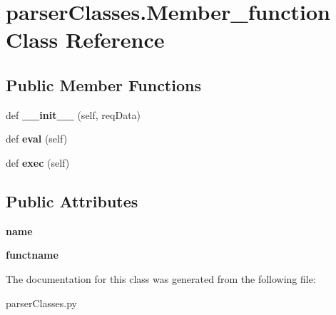 \hypertarget{classparser_classes_1_1_member__function}{}\section{parser\+Classes.\+Member\+\_\+function Class Reference}
\label{classparser_classes_1_1_member__function}
\subsection*{Public Member Functions}
\begin{DoxyCompactItemize}
\item 
def {\bfseries \+\_\+\+\_\+init\+\_\+\+\_\+} (self, req\+Data)\hypertarget{classparser_classes_1_1_member__function_a497b32d0e46480abd8f4f573ee68a3b0}{}\label{classparser_classes_1_1_member__function_a497b32d0e46480abd8f4f573ee68a3b0}

\item 
def {\bfseries eval} (self)\hypertarget{classparser_classes_1_1_member__function_ae132533c55122b32a25746696db39249}{}\label{classparser_classes_1_1_member__function_ae132533c55122b32a25746696db39249}

\item 
def {\bfseries exec} (self)\hypertarget{classparser_classes_1_1_member__function_aa938612d9582fb3851370a7680f84efe}{}\label{classparser_classes_1_1_member__function_aa938612d9582fb3851370a7680f84efe}

\end{DoxyCompactItemize}
\subsection*{Public Attributes}
\begin{DoxyCompactItemize}
\item 
{\bfseries name}\hypertarget{classparser_classes_1_1_member__function_a3937d00f545419b14a3807f66fb89a8b}{}\label{classparser_classes_1_1_member__function_a3937d00f545419b14a3807f66fb89a8b}

\item 
{\bfseries functname}\hypertarget{classparser_classes_1_1_member__function_a01cc4459bfeab553a8fb2c3f99110b7e}{}\label{classparser_classes_1_1_member__function_a01cc4459bfeab553a8fb2c3f99110b7e}

\end{DoxyCompactItemize}


The documentation for this class was generated from the following file\+:\begin{DoxyCompactItemize}
\item 
parser\+Classes.\+py\end{DoxyCompactItemize}

